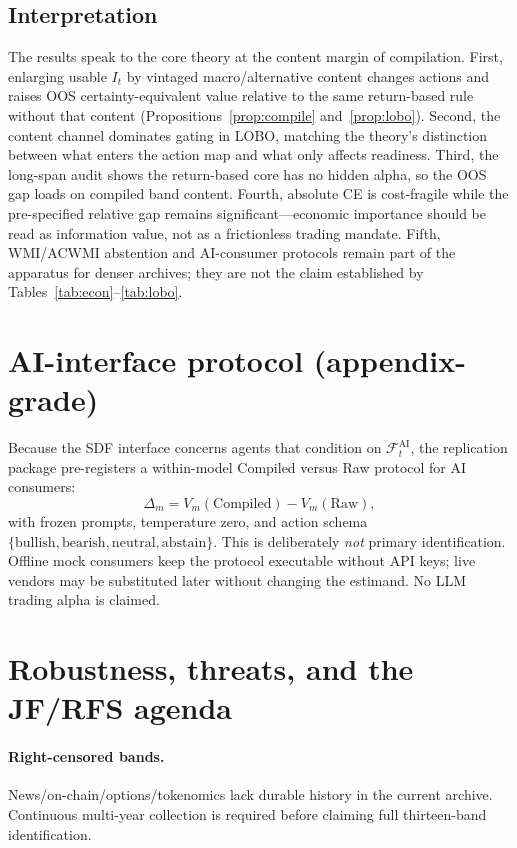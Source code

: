 \documentclass[12pt]{article}
\begin{document}
\subsection{Interpretation}
The results speak to the core theory at the content margin of compilation. First, enlarging usable $I_t$ by vintaged macro/alternative content changes actions and raises OOS certainty-equivalent value relative to the same return-based rule without that content (Propositions~\ref{prop:compile} and~\ref{prop:lobo}). Second, the content channel dominates gating in LOBO, matching the theory's distinction between what enters the action map and what only affects readiness. Third, the long-span audit shows the return-based core has no hidden alpha, so the OOS gap loads on compiled band content. Fourth, absolute CE is cost-fragile while the pre-specified relative gap remains significant---economic importance should be read as information value, not as a frictionless trading mandate. Fifth, WMI/ACWMI abstention and AI-consumer protocols remain part of the apparatus for denser archives; they are not the claim established by Tables~\ref{tab:econ}--\ref{tab:lobo}.

\section{AI-interface protocol (appendix-grade)}
\label{sec:ai_consumer}

Because the SDF interface concerns agents that condition on $\mathcal{F}^{\mathrm{AI}}_t$, the replication package pre-registers a within-model Compiled versus Raw protocol for AI consumers:
\[
\Delta_m=V_m(\mathrm{Compiled})-V_m(\mathrm{Raw}),
\]
with frozen prompts, temperature zero, and action schema $\{\mathrm{bullish},\mathrm{bearish},\mathrm{neutral},\mathrm{abstain}\}$. This is deliberately \emph{not} primary identification. Offline mock consumers keep the protocol executable without API keys; live vendors may be substituted later without changing the estimand. No LLM trading alpha is claimed.

\section{Robustness, threats, and the JF/RFS agenda}
\label{sec:robust}

\paragraph{Right-censored bands.}
News/on-chain/options/tokenomics lack durable history in the current archive. Continuous multi-year collection is required before claiming full thirteen-band identification.
\end{document}
